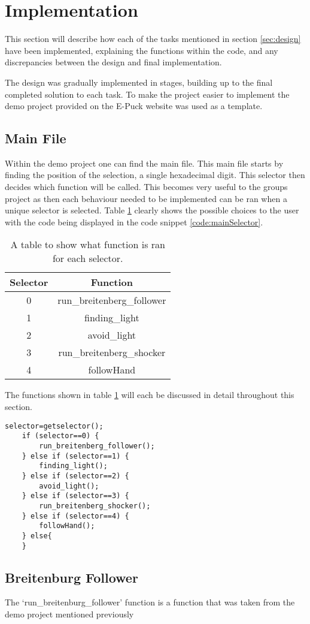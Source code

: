 \section{Implementation}
\label{sec:implementation}
This section will describe how each of the tasks mentioned in section \ref{sec:design} have been implemented, explaining the functions within the code, and any discrepancies between the design and final implementation.

The design was gradually implemented in stages, building up to the final completed solution to each task. To make the project easier to implement the demo project provided on the E-Puck\cite{epuck} website was used as a template.
\subsection{Main File}
Within the demo project one can find the main file. This main file starts by finding the position of the selection, a single hexadecimal digit. This selector then decides which function will be called. This becomes very useful to the groups project as then each behaviour needed to be implemented can be ran when a unique selector is selected. Table \ref{table:selectorOptions} clearly shows the possible choices to the user with the code being displayed in the code snippet \ref{code:mainSelector}.

\begin{table}
	\centering
	\begin{tabular}{|c | c|} 
	\hline
	Selector & Function \\ \hline
	0 & run\_breitenberg\_follower \\ \hline
	1 & finding\_light \\ \hline
	2 & avoid\_light \\ \hline
	3 & run\_breitenberg\_shocker \\ \hline
	4 & followHand \\ \hline
	\end{tabular}
	\label{table:selectorOptions}
	\caption{A table to show what function is ran for each selector.}
\end{table}

The functions shown in table \ref{table:selectorOptions} will each be discussed in detail throughout this section.

\begin{lstlisting}[frame=single,caption={Descriptive Caption Text},label=code:mainSelector, float,floatplacement=H]
	selector=getselector();
	if (selector==0) {
		run_breitenberg_follower();
	} else if (selector==1) {
		finding_light();
	} else if (selector==2) {
		avoid_light();
	} else if (selector==3) {
		run_breitenberg_shocker();
	} else if (selector==4) {
		followHand();
	} else{
	}
\end{lstlisting}

\subsection{Breitenburg Follower}
The `run\_breitenburg\_follower' function is a function that was taken from the demo project mentioned previously